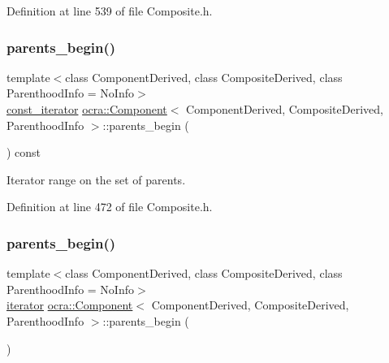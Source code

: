 Definition at line 539 of file Composite.\+h.

\hypertarget{classocra_1_1Component_ad140927464e2afefd563ee52751bb09f}{}\label{classocra_1_1Component_ad140927464e2afefd563ee52751bb09f} 
\subsubsection{\texorpdfstring{parents\+\_\+begin()}{parents\_begin()}\hspace{0.1cm}{\footnotesize\ttfamily [1/2]}}
{\footnotesize\ttfamily template$<$class Component\+Derived, class Composite\+Derived, class Parenthood\+Info = No\+Info$>$ \\
\hyperlink{classocra_1_1Component_a6271631f04d2911e4369d1288074eebb}{const\+\_\+iterator} \hyperlink{classocra_1_1Component}{ocra\+::\+Component}$<$ Component\+Derived, Composite\+Derived, Parenthood\+Info $>$\+::parents\+\_\+begin (\begin{DoxyParamCaption}{ }\end{DoxyParamCaption}) const\hspace{0.3cm}{\ttfamily [inline]}}



Iterator range on the set of parents. 



Definition at line 472 of file Composite.\+h.

\hypertarget{classocra_1_1Component_aaca1c77fdf2c7d090f43a3eefb671eae}{}\label{classocra_1_1Component_aaca1c77fdf2c7d090f43a3eefb671eae} 
\subsubsection{\texorpdfstring{parents\+\_\+begin()}{parents\_begin()}\hspace{0.1cm}{\footnotesize\ttfamily [2/2]}}
{\footnotesize\ttfamily template$<$class Component\+Derived, class Composite\+Derived, class Parenthood\+Info = No\+Info$>$ \\
\hyperlink{classocra_1_1Component_a9b76b63c3248ec96dfdaca00d712c1c9}{iterator} \hyperlink{classocra_1_1Component}{ocra\+::\+Component}$<$ Component\+Derived, Composite\+Derived, Parenthood\+Info $>$\+::parents\+\_\+begin (\begin{DoxyParamCaption}{ }\end{DoxyParamCaption})\hspace{0.3cm}{\ttfamily [inline]}}



